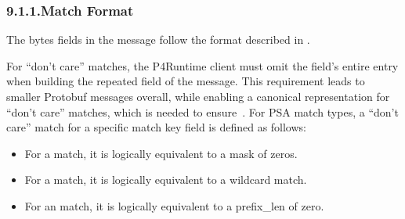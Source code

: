 \documentclass[11pt]{article}
\begin{document}
{%
\subsubsection{9.1.1.\hspace*{0.5em}Match Format}\label{sec-match-format}%

\noindent{}The bytes fields in the  message follow the format described in
.%

For \textquotedblleft{}don't care\textquotedblright{} matches, the P4Runtime client must omit the field's entire
 entry when building the  repeated field of the 
message. This requirement leads to smaller Protobuf messages overall, while
enabling a canonical representation for \textquotedblleft{}don't care\textquotedblright{} matches, which is needed
to ensure~. For PSA match types,
a \textquotedblleft{}don't care\textquotedblright{} match for a specific match key field is defined as follows:%

\begin{itemize}%

\item{}
For a  match, it is logically equivalent to a mask of zeros.%

\item{}
For a  match, it is logically equivalent to a wildcard match.%

\item{}
For an  match, it is logically equivalent to a prefix\_len of zero.%


\end{itemize}}
\end{document}
